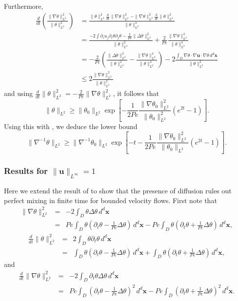 \documentclass[12pt]{iopart}
\newcommand{\ddt}[1]{\frac{d #1}{dt}}
\newcommand{\hmone}[1]{\|\nabla^{-1} #1\|_{L^{2}}}
\newcommand{\ltwo}[1]{\|#1\|_{L^{2}}}
\newcommand{\hone}[1]{\| \nabla #1\|_{L^{2}}}
\newcommand{\sint}[1]{\int_{D} #1 \, d^{d}\mathbf{x}}
\renewcommand{\vec}[1]{\mathbf{#1}}
\newcommand{\linf}[1]{\| #1 \|_{L^{\infty}}}
\renewcommand{\u}{\mathbf{u}}
\newcommand{\ppt}[1]{\partial_{t} #1}
\newcommand{\lap}{\Delta }
\begin{document}
Furthermore,
%
\numparts \begin{eqnarray}
\frac{d}{dt}\left(\frac{\|\nabla\theta\|_{L^{2}}^2}{\|\theta\|_{L^{2}}^2}\right) &= \frac{\|\theta\|_{L^{2}}^2\frac{d}{dt}\|\nabla\theta\|_{L^{2}}^2-\|\nabla\theta\|_{L^{2}}^2\frac{d}{dt}\|\theta\|_{L^{2}}^2}{\|\theta\|_{L^{2}}^4}\\
&= \frac{-2\int \partial_{i}u_{j}\partial_{i}\theta\partial_{j}\theta - \frac{2}{Pe} \|\Delta\theta\|_{L^{2}}^2}{\|\theta\|_{L^{2}}^2}+\frac{2}{Pe}\frac{\|\nabla\theta\|_{L^{2}}^4}{\|\theta\|_{L^{2}}^4} \\
&=-\frac{2}{Pe}\left(\frac{\|\Delta\theta\|_{L^{2}}^2}{\|\theta\|_{L^{2}}^2} - \frac{\|\nabla\theta\|_{L^{2}}^4}{\|\theta\|_{L^{2}}^4} \right) - 2\frac{\sint{\nabla\theta \cdot \nabla\vec{u} \cdot 
							\nabla\theta  }}{\|\theta\|_{L^{2}}^2} 
\\
&\leq 2 \frac{\hone{\theta}^2}{\ltwo{\theta}^2}
\end{eqnarray} \endnumparts
%
and using $\ddt{}\ltwo{\theta}^2 = -\frac{2}{Pe} \hone{\theta}^2$, it follows that
\begin{equation}
\ltwo{\theta}\geq  \ltwo{\theta_{0}}\exp\left[-\frac{1}{2Pe}\frac{\hone{\theta_{0}}^2}{\ltwo{\theta_{0}}^2}\left(e^{2 t} -1\right)\right].
\end{equation}
Using this with , we deduce the lower bound
\begin{equation}
\hmone{\theta} \geq  \hmone{\theta_{0}} \exp\left[- t -\frac{1}{2 Pe}\frac{\hone{\theta_{0}}^2}{\ltwo{\theta_{0}}}\left(e^{2 t} -1\right)\right].
\end{equation}

\subsubsection{Results for $\linf{\u}= 1$}
Here we extend the result of \cite{Chi-Cheu1996} to show that the presence of diffusion rules out perfect mixing in finite time for bounded velocity flows.  First note that
%
\begin{eqnarray}
	 \hone{\theta}^2 &=& - 2\sint{\theta \lap \theta} \\
	 							&=& Pe \sint{\theta\left(\ppt{\theta}
	 									-\frac{1}{Pe}\lap \theta\right)} 
	 									-Pe \sint{\theta\left(\ppt{\theta}
	 									+\frac{1}{Pe}\lap \theta\right)},
\end{eqnarray}
%
\begin{eqnarray}
	\ddt{}\ltwo{\theta}^2 &=& 2\sint{\theta\ppt{\theta}} \\
										 &=&\sint{\theta\left(\ppt{\theta}
	 									-\frac{1}{Pe}\lap \theta\right)} 
										 + \sint{\theta\left(\ppt{\theta}
	 									+\frac{1}{Pe}\lap \theta\right)} ,
\end{eqnarray}
%
and
%
\begin{eqnarray}
	\ddt{}\hone{\theta}^2 &=& -2\sint{\ppt{\theta}\lap \theta} \\
	 									&=& Pe \sint{\left(\ppt{\theta}
	 									-\frac{1}{Pe}\lap \theta\right)^2} 
	 									-Pe \sint{\left(\ppt{\theta}
	 									+\frac{1}{Pe}\lap \theta\right)^2} .
\end{eqnarray}
\end{document}
